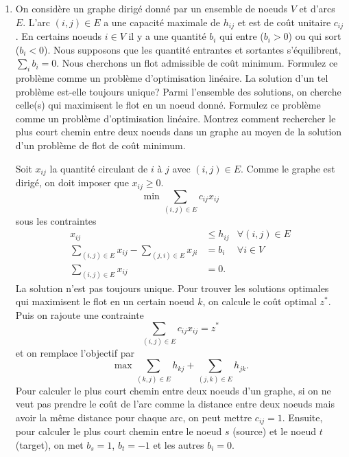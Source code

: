 \begin{enumerate}
  \item On considère  un graphe dirigé donné par un ensemble de noeuds $V$ et d'arcs $E$. L'arc
    $(i, j) \in E$ a une  capacité maximale de
    $h_{ij}$ et est de coût unitaire
    $c_{ij}$. En certains noeuds
    $i \in V$ il y a une quantité
    $b_i$ qui entre  ($b_i >0$) ou qui sort ($b_i <0$). Nous supposons que les quantité entrantes et sortantes s'équilibrent, $\sum_i b_i=0$. Nous
    cherchons un flot admissible de coût minimum.  Formulez ce problème comme un problème d'optimisation linéaire. La solution d'un tel problème est-elle
    toujours unique? Parmi l'ensemble des solutions, on cherche celle(s) qui maximisent le flot en un noeud donn\'e.
    Formulez ce probl\`eme comme un probl\`eme d'optimisation lin\'eaire. Montrez comment  rechercher le   plus court chemin entre deux noeuds dans un
    graphe au moyen de la solution d'un  problème de flot de coût minimum.

    \begin{solution}
      Soit $x_{ij}$ la quantité circulant de $i$ à $j$ avec $(i,j) \in E$.
      Comme le graphe est dirigé, on doit imposer que $x_{ij} \geq 0$.
      \[ \min \sum_{(i,j) \in E} c_{ij}x_{ij} \]
      sous les contraintes
      \begin{align*}
        x_{ij} & \leq h_{ij} & \forall (i,j) \in E\\
        \sum_{(i,j) \in E} x_{ij} - \sum_{(j,i) \in E} x_{ji}
        & = b_{i} & \forall i \in V\\
        \sum_{(i,j) \in E} x_{ij} & = 0.
      \end{align*}
      La solution n'est pas toujours unique.
      Pour trouver les solutions optimales qui maximisent
      le flot en un certain noeud $k$, on calcule le coût optimal $z^*$.
      Puis on rajoute une contrainte
      \[ \sum_{(i,j) \in E} c_{ij}x_{ij} = z^* \]
      et on remplace l'objectif par
      \[ \max \sum_{(k,j) \in E} h_{kj} + \sum_{(j,k) \in E} h_{jk}. \]
      Pour calculer le plus court chemin entre deux noeuds d'un graphe,
      si on ne veut pas prendre le coût de l'arc comme la distance entre
      deux noeuds mais avoir la même distance pour chaque arc,
      on peut mettre $c_{ij} = 1$.
      Ensuite, pour calculer le plus court chemin entre
      le noeud $s$ (source) et le noeud $t$ (target),
      on met $b_s = 1$, $b_t = -1$ et les autres $b_i = 0$.
    \end{solution}

\end{enumerate}
